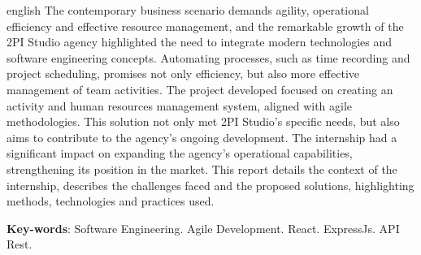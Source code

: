 \documentclass[
	12pt,				    %
	openright,			    %
	oneside,			    %
	a4paper,			    %
    sumario=tradicional,    %
	english,			    %
	brazilian,				    %
	]{abntex2}
\begin{document}
\begin{resumo}[Abstract]
    \begin{otherlanguage*}{english}
        \noindent
        The contemporary business scenario demands agility, operational efficiency and effective resource management, and the remarkable growth of the 2PI Studio agency highlighted the need to integrate modern technologies and software engineering concepts. Automating processes, such as time recording and project scheduling, promises not only efficiency, but also more effective management of team activities. The project developed focused on creating an activity and human resources management system, aligned with agile methodologies. This solution not only met 2PI Studio's specific needs, but also aims to contribute to the agency's ongoing development. The internship had a significant impact on expanding the agency's operational capabilities, strengthening its position in the market. This report details the context of the internship, describes the challenges faced and the proposed solutions, highlighting methods, technologies and practices used.
        \vspace{\onelineskip}

        \noindent
        \textbf{Key-words}: Software Engineering. Agile Development. React. ExpressJs. API Rest.
    \end{otherlanguage*}
\end{resumo}



\listoftables*
\cleardoublepage







\tableofcontents*
\cleardoublepage
\end{document}
